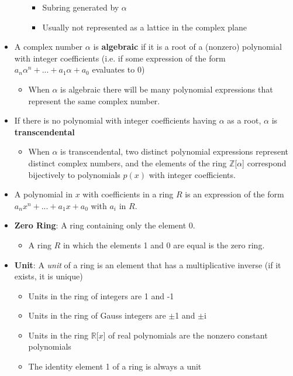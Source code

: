\documentclass[12pt]{article}
\begin{document}
\begin{itemize}
\begin{itemize}
\begin{itemize}
      \item Subring generated by $\alpha$
      \item Usually not represented as a lattice in the complex plane
    \end{itemize}
  \end{itemize}
  \item A complex number $\alpha$ is \textbf{algebraic} if it is a root of a (nonzero) polynomial with integer coefficients (i.e. if some expression of the form $a_n\alpha^n + ... + a_1\alpha + a_0$ evaluates to 0)
  \begin{itemize}
    \item When $\alpha$ is algebraic there will be many polynomial expressions that represent the same complex number.
  \end{itemize}
  \item If there is no polynomial with integer coefficients having $\alpha$ as a root, $\alpha$ is \textbf{transcendental}
  \begin{itemize}
    \item When $\alpha$ is transcendental, two distinct polynomial expressions represent distinct complex numbers, and the elements of the ring $\mathbb{Z}$[$\alpha$] correspond bijectively to polynomials $p(x)$ with integer coefficients.
  \end{itemize}
  \item A polynomial in $x$ with coefficients in a ring $R$ is an expression of the form $a_nx^n + ... + a_1x + a_0$ with $a_i$ in $R$.
  \item \textbf{Zero Ring}: A ring containing only  the element 0.
  \begin{itemize}
    \item A ring $R$ in which the elements 1 and 0 are equal is the zero ring.
  \end{itemize}
  \item \textbf{Unit}: A \textit{unit} of a ring is an element that has a multiplicative inverse (if it exists, it is unique)
  \begin{itemize}
    \item Units in the ring of integers are 1 and -1
    \item Units in the ring of Gauss integers are $\pm$1 and $\pm$i
    \item Units in the ring $\mathbb{R}$[$x$] of real polynomials are the nonzero constant polynomials
    \item The identity element 1 of a ring is always a unit
  \end{itemize}
\end{itemize}
\end{document}
